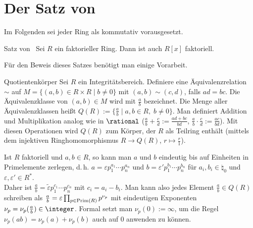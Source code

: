 \section{%
    Der Satz von %
}

\begin{Bem}
    Im Folgenden sei jeder Ring als kommutativ vorausgesetzt.
\end{Bem}

\begin{Theorem}{Satz von \upshape\,\!}
    Sei $R$ ein faktorieller Ring.
    Dann ist auch $R[x]$ faktoriell.
\end{Theorem}

\linie

\begin{Bem}
    Für den Beweis dieses Satzes benötigt man einige Vorarbeit.
\end{Bem}

\begin{Def}{Quotientenkörper}
    Sei $R$ ein Integritätsbereich.
    Definiere eine Äquivalenzrelation $\sim$ auf
    $M = \{(a, b) \in R \times R \;|\; b \not= 0\}$ mit
    $(a, b) \sim (c, d)$, falls $ad = bc$.
    Die Äquivalenzklasse von $(a, b) \in M$ wird mit $\frac{a}{b}$
    bezeichnet.
    Die Menge aller Äquivalenzklassen heißt 
    $Q(R) := \{\frac{a}{b} \;|\; a, b \in R,\; b \not= 0\}$.
    Man definiert Addition und Multiplikation analog wie in $\rational$
    ($\frac{a}{b} + \frac{c}{d} := \frac{ad + bc}{bd}$,
    $\frac{a}{b} \cdot \frac{c}{d} := \frac{ac}{bd}$).
    Mit diesen Operationen wird $Q(R)$ zum Körper, der $R$ als Teilring
    enthält (mittels dem injektiven Ringhomomorphismus
    $R \rightarrow Q(R)$, $r \mapsto \frac{r}{1}$).
\end{Def}

\begin{Bem}
    Ist $R$ faktoriell und $a, b \in R$, so kann man $a$ und $b$ eindeutig
    bis auf Einheiten in Primelemente zerlegen, d.\,h.
    $a = \varepsilon p_1^{a_1} \dotsm p_n^{a_n}$ und
    $b = \varepsilon' p_1^{b_1} \dotsm p_n^{b_n}$
    für $a_i, b_i \in \natural_0$ und $\varepsilon, \varepsilon' \in R^\ast$.\\
    Daher ist
    $\frac{a}{b} = \widetilde{\varepsilon} p_1^{c_1} \dotsm p_n^{c_n}$
    mit $c_i = a_i - b_i$.
    Man kann also jedes Element $\frac{a}{b} \in Q(R)$ schreiben als
    $\frac{a}{b} = \varepsilon \prod_{p \in \operatorname{Prim}(R)} p^{\nu_p}$ mit
    eindeutigen Exponenten $\nu_p = \nu_p(\frac{a}{b}) \in \integer$.
    Formal setzt man $\nu_p(0) := \infty$, um die Regel
    $\nu_p(ab) = \nu_p(a) + \nu_p(b)$ auch auf $0$ anwenden zu können.
\end{Bem}

